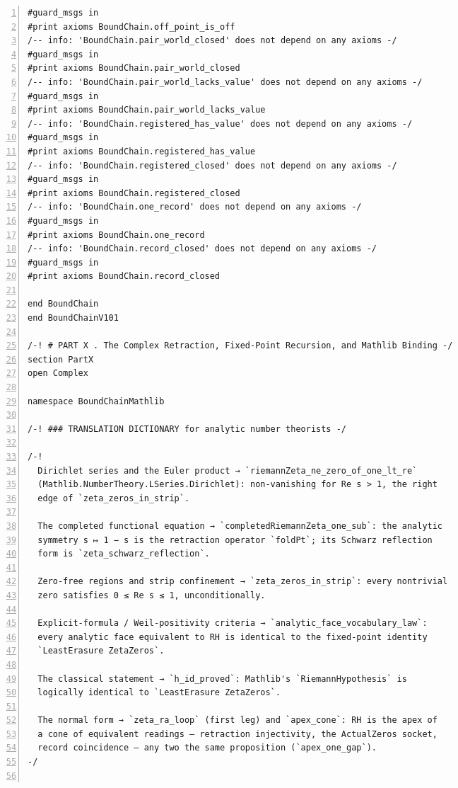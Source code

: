 \documentclass[10pt]{article}
\newcommand{\leansize}{\fontsize{5.5pt}{6.75pt}\selectfont}
\begin{document}
\begin{multicols}{2}
\begin{Verbatim}[numbers=left,firstnumber=1,numbersep=3pt,xleftmargin=2.6em,breaklines=true,breakanywhere=true,breakautoindent=false,breakindent=1.4em,breaksymbolleft={},breakanywheresymbolpre={},fontsize=\leansize]
#guard_msgs in
#print axioms BoundChain.off_point_is_off
/-- info: 'BoundChain.pair_world_closed' does not depend on any axioms -/
#guard_msgs in
#print axioms BoundChain.pair_world_closed
/-- info: 'BoundChain.pair_world_lacks_value' does not depend on any axioms -/
#guard_msgs in
#print axioms BoundChain.pair_world_lacks_value
/-- info: 'BoundChain.registered_has_value' does not depend on any axioms -/
#guard_msgs in
#print axioms BoundChain.registered_has_value
/-- info: 'BoundChain.registered_closed' does not depend on any axioms -/
#guard_msgs in
#print axioms BoundChain.registered_closed
/-- info: 'BoundChain.one_record' does not depend on any axioms -/
#guard_msgs in
#print axioms BoundChain.one_record
/-- info: 'BoundChain.record_closed' does not depend on any axioms -/
#guard_msgs in
#print axioms BoundChain.record_closed

end BoundChain
end BoundChainV101

/-! # PART X . The Complex Retraction, Fixed-Point Recursion, and Mathlib Binding -/
section PartX
open Complex

namespace BoundChainMathlib

/-! ### TRANSLATION DICTIONARY for analytic number theorists -/

/-!
  Dirichlet series and the Euler product → `riemannZeta_ne_zero_of_one_lt_re`
  (Mathlib.NumberTheory.LSeries.Dirichlet): non-vanishing for Re s > 1, the right
  edge of `zeta_zeros_in_strip`.

  The completed functional equation → `completedRiemannZeta_one_sub`: the analytic
  symmetry s ↦ 1 − s is the retraction operator `foldPt`; its Schwarz reflection
  form is `zeta_schwarz_reflection`.

  Zero-free regions and strip confinement → `zeta_zeros_in_strip`: every nontrivial
  zero satisfies 0 ≤ Re s ≤ 1, unconditionally.

  Explicit-formula / Weil-positivity criteria → `analytic_face_vocabulary_law`:
  every analytic face equivalent to RH is identical to the fixed-point identity
  `LeastErasure ZetaZeros`.

  The classical statement → `h_id_proved`: Mathlib's `RiemannHypothesis` is
  logically identical to `LeastErasure ZetaZeros`.

  The normal form → `zeta_ra_loop` (first leg) and `apex_cone`: RH is the apex of
  a cone of equivalent readings — retraction injectivity, the ActualZeros socket,
  record coincidence — any two the same proposition (`apex_one_gap`).
-/


\end{Verbatim}
\end{multicols}
\end{document}
